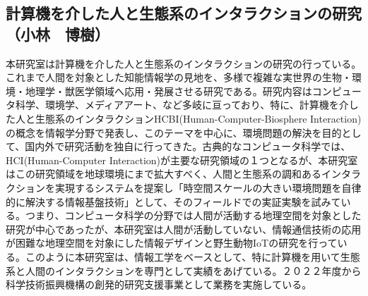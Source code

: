 \subsection{計算機を介した人と生態系のインタラクションの研究（小林　博樹）}

本研究室は計算機を介した人と生態系のインタラクションの研究の行っている。これまで人間を対象とした知能情報学の見地を、多様で複雑な実世界の生物・環境・地理学・獣医学領域へ応用・発展させる研究である。研究内容はコンピュータ科学、環境学、メディアアート、など多岐に亘っており、特に、計算機を介した人と生態系のインタラクションHCBI(Human-Computer-Biosphere Interaction)の概念を情報学分野で発表し、このテーマを中心に、環境問題の解決を目的として、国内外で研究活動を独自に行ってきた。古典的なコンピュータ科学では、HCI(Human-Computer Interaction)が主要な研究領域の１つとなるが、本研究室はこの研究領域を地球環境にまで拡大すべく、人間と生態系の調和あるインタラクションを実現するシステムを提案し「時空間スケールの大きい環境問題を自律的に解決する情報基盤技術」として、そのフィールドでの実証実験を試みている。つまり、コンピュータ科学の分野では人間が活動する地理空間を対象とした研究が中心であったが、本研究室は人間が活動していない、情報通信技術の応用が困難な地理空間を対象にした情報デザインと野生動物IoTの研究を行っている。このように本研究室は、情報工学をベースとして、特に計算機を用いて生態系と人間のインタラクションを専門として実績をあげている。２０２２年度から科学技術振興機構の創発的研究支援事業として業務を実施している。
 